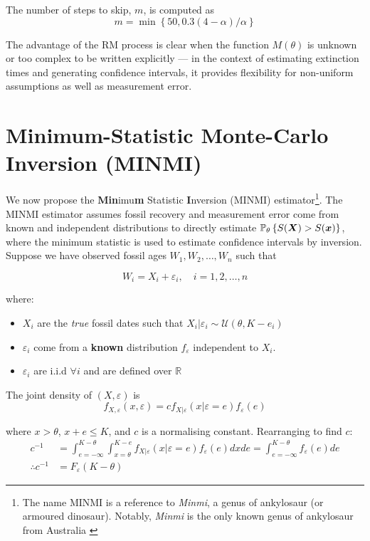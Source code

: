 The number of steps to skip, $m$, is computed as \[
m = \min \left\{ 50, 0.3(4-\alpha)/\alpha \right\}
\]

The advantage of the RM process is clear when the function $M(\theta)$ is unknown or too complex to be written explicitly --- in the context of estimating extinction times and generating confidence intervals, it provides flexibility for non-uniform assumptions as well as measurement error.

\clearpage

\section{Minimum-Statistic Monte-Carlo Inversion (MINMI)}\label{new-method}

We now propose the \textbf{Min}imu\textbf{m} Statistic \textbf{I}nversion (MINMI) estimator\footnote{The name MINMI is a reference to \textit{Minmi}, a genus of ankylosaur (or armoured dinosaur). Notably, \textit{Minmi} is the only known genus of ankylosaur from Australia \parencite{Carpenter2001}}. The MINMI estimator assumes fossil recovery and measurement error come from known and independent distributions to directly estimate $\mathbb{P}_\theta\left\{S(\bm{X}) > S(\bm{x})\right\}$, where the minimum statistic is used to estimate confidence intervals by inversion. Suppose we have observed fossil ages $W_1, W_2, \dots, W_n$ such that

\[
W_i = X_i + \varepsilon_i, \quad i = 1, 2, \dots, n
\]

where:
\begin{itemize}
    \item $X_i$ are the \textit{true} fossil dates such that $X_i | \varepsilon_i \sim \mathcal{U}(\theta, K - e_i) $
    \item $\varepsilon_i$ come from a \textbf{known} distribution $f_{\varepsilon}$ independent to $X_i$.
    \item $\varepsilon_i$ are i.i.d $\forall i$ and are defined over $\mathbb{R}$
\end{itemize}

The joint density of $(X, \varepsilon)$ is \[ f_{X, \varepsilon} ( x , \varepsilon) = c f_{X | \varepsilon} ( x | \varepsilon=e) f_\varepsilon(e) \]

where $x > \theta$, $x+e \leq K$, and $c$ is a normalising constant. Rearranging to find $c$:
\begin{align*}
    c^{-1}
        &= \int_{e=-\infty}^{K-\theta} \int_{x=\theta}^{K-e} f_{X | \varepsilon} ( x | \varepsilon=e) f_\varepsilon(e) dx de = \int_{e=-\infty}^{K-\theta} f_\varepsilon(e) de \\
    \therefore c^{-1} &= F_\varepsilon(K - \theta)
\end{align*}

